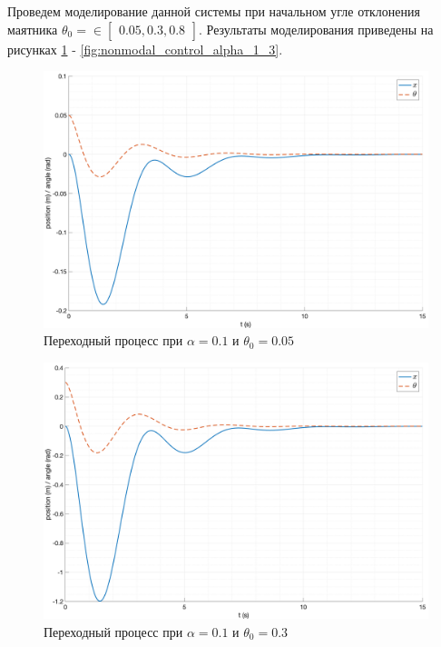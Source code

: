 Проведем моделирование данной системы при начальном угле отклонения маятника $\theta_0 = \in \begin{bmatrix} 0.05, 0.3, 0.8\end{bmatrix}$. 
Результаты моделирования приведены на рисунках \ref{fig:nonmodal_control_alpha_1_1} - \ref{fig:nonmodal_control_alpha_1_3}.
\begin{figure}[ht!]
    \centering
    \includegraphics[width=\textwidth]{media/plots/nonmodal_controlers_min/out_1.png}
    \caption{Переходный процесс при $\alpha = 0.1$ и $\theta_0 = 0.05$}
    \label{fig:nonmodal_control_alpha_1_1}
\end{figure}
\begin{figure}[ht!]
    \centering
    \includegraphics[width=\textwidth]{media/plots/nonmodal_controlers_min/out_2.png}
    \caption{Переходный процесс при $\alpha = 0.1$ и $\theta_0 = 0.3$}
    \label{fig:nonmodal_control_alpha_1_2}
\end{figure}
